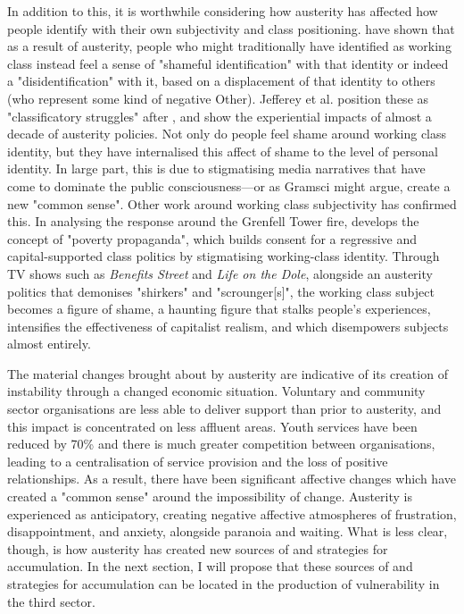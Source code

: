 In addition to this, it is worthwhile considering how austerity has affected how people identify with their own subjectivity and class positioning. \citet[p. 128]{jeffery_classificatory_2019}  have shown that as a result of austerity, people who might traditionally have identified as working class instead feel a sense of "shameful identification" with that identity or indeed a "disidentification" with it, based on a displacement of that identity to others (who represent some kind of negative Other). Jefferey et al. position these as "classificatory struggles" after \citet{tyler_classificatory_2015}, and show the experiential impacts of almost a decade of austerity policies. Not only do people feel shame around working class identity, but they have internalised this affect of shame to the level of personal identity. In large part, this is due to stigmatising media narratives that have come to dominate the public consciousness—or as Gramsci might argue, create a new "common sense". Other work around working class subjectivity has confirmed this. In analysing the response around the Grenfell Tower fire, \citet[p. 783]{shildrick_lessons_2018} develops the concept of "poverty propaganda", which builds consent for a regressive and capital-supported class politics by stigmatising working-class identity. Through TV shows such as \emph{Benefits Street} and \emph{Life on the Dole}, alongside an austerity politics that demonises "shirkers" and "scrounger[s]", the working class subject becomes a figure of shame, a haunting figure that stalks people's experiences, intensifies the effectiveness of capitalist realism, and which disempowers subjects almost entirely.

The material changes brought about by austerity are indicative of its creation of instability through a changed economic situation. Voluntary and community sector organisations are less able to deliver support than prior to austerity, and this impact is concentrated on less affluent areas. Youth services have been reduced by 70\% and there is much greater competition between organisations, leading to a centralisation of service provision and the loss of positive relationships. As a result, there have been significant affective changes which have created a "common sense" around the impossibility of change. Austerity is experienced as anticipatory, creating negative affective atmospheres of frustration, disappointment, and anxiety, alongside paranoia and waiting. What is less clear, though, is how austerity has created new sources of and strategies for accumulation. In the next section, I will propose that these sources of and strategies for accumulation can be located in the production of vulnerability in the third sector.

